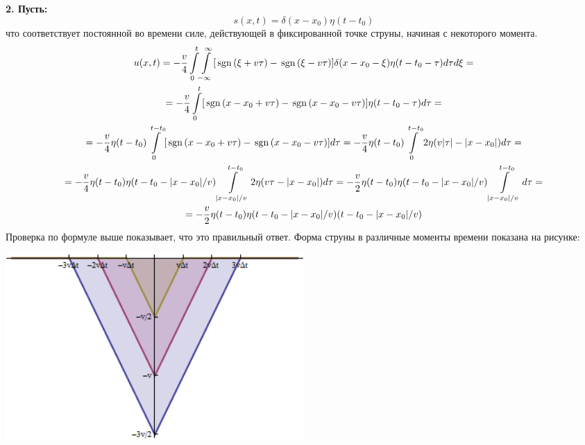 \textbf{2. Пусть:}
\[
s(x, t) = \delta(x - x_0) \eta(t - t_0)
\]
что соответствует постоянной во времени силе, действующей в фиксированной точке струны, начиная с некоторого момента.
\[
\begin{gathered}
u(x, t) =
-\frac{v}{4} \int\limits_{0}^{t} \! \int\limits_{-\infty}^{\infty} [ \mathrm{\,sgn}\, (\xi + v \tau) - \mathrm{\,sgn}\, (\xi - v\tau) ]  \delta(x - x_0 - \xi) \eta(t - t_0 - \tau) d\tau d\xi =
\\ =
-\frac{v}{4} \int\limits_{0}^{t} [ \mathrm{\,sgn}\, (x - x_0 + v \tau) - \mathrm{\,sgn}\, (x - x_0 - v\tau) ] \eta (t - t_0 - \tau)  d\tau =
\\ =
-\frac{v}{4} \eta(t - t_0) \int\limits_{0}^{t - t_0} [ \mathrm{\,sgn}\, (x - x_0 + v \tau) - \mathrm{\,sgn}\, (x - x_0 - v\tau) ] d\tau = 
-\frac{v}{4} \eta(t - t_0) \int\limits_{0}^{t - t_0} 2 \eta(v|\tau| - |x - x_0|) d\tau =
\\ =
-\frac{v}{4} \eta(t - t_0) \eta(t - t_0 - |x - x_0|/v) \int\limits_{|x - x_0|/v}^{t - t_0} 2 \eta(v\tau - |x - x_0|) d\tau = 
-\frac{v}{2} \eta(t - t_0) \eta(t - t_0 - |x - x_0|/v) \int\limits_{|x - x_0|/v}^{t - t_0} d\tau =
\\ =
-\frac{v}{2} \eta(t - t_0) \eta(t - t_0 - |x - x_0|/v) (t - t_0 - |x - x_0|/v) 
\end{gathered}
\]
Проверка по формуле выше показывает, что это правильный ответ. Форма струны в различные моменты времени показана на рисунке:
\begin{center}
	\includegraphics[width=0.5\textwidth]{images/png/for_deltac_force.png}
\end{center}

